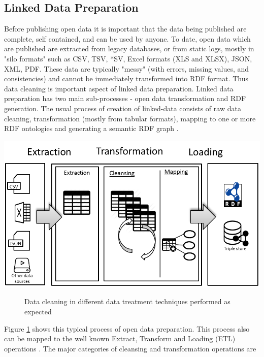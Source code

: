 \subsection{Linked Data Preparation}
\label{sec:opendatapreparation}
\noindent Before publishing open data it is important that the data being published are complete, self contained, and can be used by anyone. To date, open data which are published are extracted from legacy databases, or from static logs, mostly \cite{collaborativeopendataversioning} in "silo formats" such as CSV, TSV, *SV, Excel formats (XLS and XLSX), JSON, XML, PDF. These data are typically "messy" (with errors, missing values, and consistencies) and cannot be immediately transformed into RDF format. Thus data cleaning is important aspect of linked data preparation. Linked data preparation has two main sub-processes - open data transformation and RDF generation. The usual process of creation of linked-data consists of raw data cleaning, transformation (mostly from tabular formats), mapping to one or more RDF ontologies and generating a semantic RDF graph \cite{datagraftsimplyfyingopendatapublishing}. 
\begin{center}
	\includegraphics[width=38em]{./Figures/opendatapreparation2}
	\begin{figure}[htbp]
    \caption{Data cleaning in different data treatment techniques performed as expected}
    \label{fig:opendataprep}
	\end{figure}
\end{center}
\noindent Figure \ref{fig:opendataprep} shows this typical process of open data preparation. This process also can be mapped to the well known Extract, Transform and Loading (ETL) operations \cite{collaborativeopendataversioning}. The major categories of cleansing and transformation operations are 
